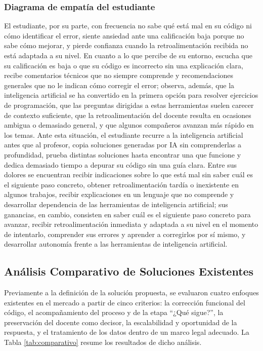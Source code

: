 \documentclass[letterpaper, 10 pt, conference]{ieeeconf}
\begin{document}
\subsubsection{Diagrama de empatía del estudiante}
El estudiante, por su parte, con frecuencia no sabe qué está mal en su código ni cómo identificar el error, siente ansiedad ante una calificación baja porque no sabe cómo mejorar, y pierde confianza cuando la retroalimentación recibida no está adaptada a su nivel. En cuanto a lo que percibe de su entorno, escucha que su calificación es baja o que su código es incorrecto sin una explicación clara, recibe comentarios técnicos que no siempre comprende y recomendaciones generales que no le indican cómo corregir el error; observa, además, que la inteligencia artificial se ha convertido en la primera opción para resolver ejercicios de programación, que las preguntas dirigidas a estas herramientas suelen carecer de contexto suficiente, que la retroalimentación del docente resulta en ocasiones ambigua o demasiado general, y que algunos compañeros avanzan más rápido en los temas. Ante esta situación, el estudiante recurre a la inteligencia artificial antes que al profesor, copia soluciones generadas por IA sin comprenderlas a profundidad, prueba distintas soluciones hasta encontrar una que funcione y dedica demasiado tiempo a depurar su código sin una guía clara. Entre sus dolores se encuentran recibir indicaciones sobre lo que está mal sin saber cuál es el siguiente paso concreto, obtener retroalimentación tardía o inexistente en algunos trabajos, recibir explicaciones en un lenguaje que no comprende y desarrollar dependencia de las herramientas de inteligencia artificial; sus ganancias, en cambio, consisten en saber cuál es el siguiente paso concreto para avanzar, recibir retroalimentación inmediata y adaptada a su nivel en el momento de intentarlo, comprender sus errores y aprender a corregirlos por sí mismo, y desarrollar autonomía frente a las herramientas de inteligencia artificial.

\subsection{Análisis Comparativo de Soluciones Existentes}
Previamente a la definición de la solución propuesta, se evaluaron cuatro enfoques existentes en el mercado a partir de cinco criterios: la corrección funcional del código, el acompañamiento del proceso y de la etapa “¿Qué sigue?”, la preservación del docente como decisor, la escalabilidad y oportunidad de la respuesta, y el tratamiento de los datos dentro de un marco legal adecuado. La Tabla \ref{tab:comparativo} resume los resultados de dicho análisis.
\end{document}

